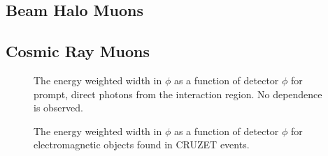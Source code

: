 \documentclass{cmspaper}
\begin{document}
\subsection{Beam Halo Muons}
\subsection{Cosmic Ray Muons}

\begin{figure}[hbtp]
  \begin{center}
    \caption{The energy weighted width in $\phi$ as a function of detector $\phi$ for prompt, direct photons from the interaction region.  No dependence is observed.}
    \label{fig:PromptPhiWidPhi}
  \end{center}
\end{figure}

\begin{figure}[hbtp]
  \begin{center}
    \caption{The energy weighted width in $\phi$ as a function of detector $\phi$ for electromagnetic objects found in
CRUZET events.}
    \label{fig:CRUZETPhiWidPhi}
  \end{center}
\end{figure}
\end{document}
